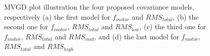 \documentclass[conference]{IEEEtran}
\begin{document}
\begin{figure}
  \caption{MVGD plot illustration the four proposed covariance models, respectively (a) the first model for $f_{motor}$ and $RMS_{total}$, (b) the second one for $f_{motor}$, $RMS_{total}$ and $RMS_{low}$, (c) the third one for $f_{motor}$, $RMS_{total}$ and $RMS_{mid}$, and (d) the last model for $f_{motor}$, $RMS_{total}$ and $RMS_{high}$}
  \label{fig_mvgd_plot} 
\end{figure}






\end{document}
